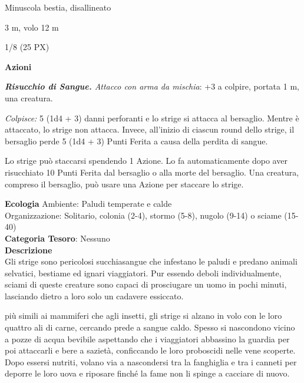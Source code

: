 \begin{multicols}{2}
{
\begin{description}[noitemsep, topsep=0pt, parsep=0pt, partopsep=0pt, itemsep=1pt, leftmargin=2.35cm,  labelwidth=2.2cm, itemindent=0cm, listparindent=0pt] %
\setlength{\baselineskip}{10pt}
\item[\textbf{Taglia/Tipo}] Minuscola bestia, disallineato
\item[\textbf{Caratt.}] 
\item[\textbf{Punti Ferita}] 
\item[\textbf{Movimento}] 3 m, volo 12 m
\item[\textbf{Tiri Salvez.}] 
\item[\textbf{Sensi}] 
\item[\textbf{Sfida}] 1/8 (25 PX)
\end{description}
\smallskip

\textbf{Azioni}

\emph{\textbf{Risucchio di Sangue.} Attacco con arma da mischia}: +3 a colpire, portata 1 m, una creatura.

\emph{Colpisce:} 5 (1d4 + 3) danni perforanti e lo strige si attacca al bersaglio. Mentre è attaccato, lo strige non attacca. Invece, all'inizio di ciascun round dello strige, il bersaglio perde 5 (1d4 + 3) Punti Ferita a causa della perdita di sangue.

Lo strige può staccarsi spendendo 1 Azione. Lo fa automaticamente dopo aver risucchiato 10 Punti Ferita dal bersaglio o alla morte del bersaglio. Una creatura, compreso il bersaglio, può usare una Azione per staccare lo strige.

\textbf{Ecologia}
Ambiente: Paludi temperate e calde\\
Organizzazione: Solitario, colonia (2-4), stormo (5-8), nugolo (9-14) o sciame (15-40)\\
\textbf{Categoria Tesoro}: Nessuno\\
\textbf{Descrizione}\\
Gli strige sono pericolosi succhiasangue che infestano le paludi e predano animali selvatici, bestiame ed ignari viaggiatori. Pur essendo deboli individualmente, sciami di queste creature sono capaci di prosciugare un uomo in pochi minuti, lasciando dietro a loro solo un cadavere essiccato.

più simili ai mammiferi che agli insetti, gli strige si alzano in volo con le loro quattro ali di carne, cercando prede a sangue caldo. Spesso si nascondono vicino a pozze di acqua bevibile aspettando che i viaggiatori abbassino la guardia per poi attaccarli e bere a sazietà, conficcando le loro proboscidi nelle vene scoperte. Dopo essersi nutriti, volano via a nascondersi tra la fanghiglia e tra i canneti per deporre le loro uova e riposare finché la fame non li spinge a cacciare di nuovo.

}
\end{multicols}
